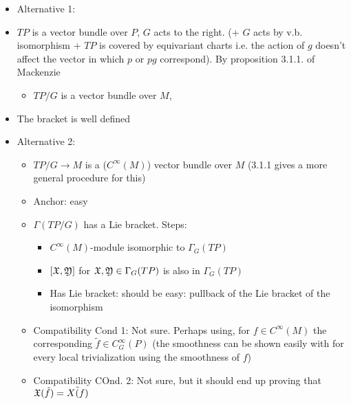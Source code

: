    \begin{itemize}
    \item Alternative 1: 
        \item $TP$ is a vector bundle over $P$, $G$ acts to the right. (+ $G$ acts by v.b. isomorphism + $TP$ is covered by equivariant charts i.e. the action of $g$ doesn't affect the vector in which $p$ or $pg$ correspond). By proposition 3.1.1. of Mackenzie 
            \begin{itemize}
            \item $TP/G$ is a vector bundle over $M$,
            \end{itemize}  
        \item The bracket is well defined
    \item Alternative 2:
        \begin{itemize}
        \item $TP/G \to M$ is a ($C^\infty(M)$) vector bundle over $M$ (3.1.1 gives a more general procedure for this)
        \item Anchor: easy
        \item $\Gamma(TP/G)$ has a Lie bracket. Steps:
            \begin{itemize}
            \item $C^\infty(M)$-module isomorphic to $\Gamma_G(TP)$
            \item $[\mathfrak{X}, \mathfrak{Y}]$ for $\mathfrak{X}, \mathfrak{Y} \in \Gamma_G(TP)$ is also in $\Gamma_G(TP)$
            \item Has Lie bracket: should be easy: pullback of the Lie bracket of the isomorphism
            \end{itemize}
        
        \item Compatibility Cond 1: Not sure. Perhaps using, for $f \in C^\infty(M)$ the corresponding $\tilde f \in C_G^\infty(P)$ (the smoothness can be shown easily with for every local trivialization using the smoothness of $f$)
        
        \item Compatibility COnd. 2: Not sure, but it should end up proving that $\mathfrak{X} (\tilde f) = \Tilde{X(f)}$
        \end{itemize}
    \end{itemize}



